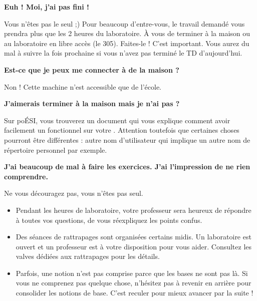 \documentclass[a4paper,11pt]{style-esi/td}
\begin{document}
	\begin{faq}
		\textbf{Euh ! Moi, j'ai pas fini !}
		
		Vous n'êtes pas le seul ;)
		Pour beaucoup d'entre-vous, 
		le travail demandé vous prendra plus que les 2 heures du laboratoire.
		À vous de terminer à la maison ou au laboratoire en libre accès (le 305).
		Faites-le ! C'est important.
		Vous aurez du mal à suivre la fois prochaine 
		si vous n'avez pas terminé le TD d'aujourd'hui.
		
		\medskip
		\textbf{Est-ce que je peux me connecter à  de la maison ?}
		
		Non ! Cette machine n'est accessible que de l'école.

		\medskip
		\textbf{J'aimerais terminer à la maison mais je n'ai pas  ?}
		
		Sur poÉSI, vous trouverez un document qui vous explique
		comment avoir facilement un  fonctionnel sur votre .
		Attention toutefois que certaines choses pourront être différentes :
		autre nom d'utilisateur qui implique un autre nom de répertoire personnel
		par exemple.

		\medskip
		\textbf{J'ai beaucoup de mal à faire les exercices. 
			J'ai l'impression de ne rien comprendre.}
		
		Ne vous découragez pas, vous n'êtes pas seul.
		\begin{itemize}
		\item 
			Pendant les heures de laboratoire, 
			votre professeur sera heureux de répondre à toutes vos questions,
			de vous réexpliquez les points confus.
		\item 
			Des séances de rattrapages sont organisées certains midis.
			Un laboratoire est ouvert et un professeur est à votre disposition
			pour vous aider. 
			Consultez les valves dédiées aux rattrapages pour les détails.
		\item 
			Parfois, une notion n'est pas comprise 
			parce que les bases ne sont pas là.
			Si vous ne comprenez pas quelque chose,
			n'hésitez pas à revenir en arrière pour consolider les notions de base.
			C'est reculer pour mieux avancer par la suite !
		\end{itemize}
	\end{faq}

	\newpage 
\end{document}
